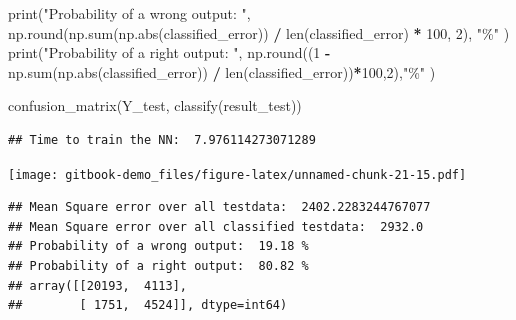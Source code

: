 \documentclass[
]{book}
\newenvironment{Shaded}{\begin{snugshade}}{\end{snugshade}}
\newcommand{\BuiltInTok}[1]{#1}
\newcommand{\DecValTok}[1]{\textcolor[rgb]{0.00,0.00,0.81}{#1}}
\newcommand{\NormalTok}[1]{#1}
\newcommand{\OperatorTok}[1]{\textcolor[rgb]{0.81,0.36,0.00}{\textbf{#1}}}
\newcommand{\StringTok}[1]{\textcolor[rgb]{0.31,0.60,0.02}{#1}}
\begin{document}
\begin{Shaded}
\begin{Highlighting}[]
\BuiltInTok{print}\NormalTok{(}\StringTok{"Probability of a wrong output: "}\NormalTok{, np.}\BuiltInTok{round}\NormalTok{(np.}\BuiltInTok{sum}\NormalTok{(np.}\BuiltInTok{abs}\NormalTok{(classified\_error)) }\OperatorTok{/} \BuiltInTok{len}\NormalTok{(classified\_error) }\OperatorTok{*} \DecValTok{100}\NormalTok{, }\DecValTok{2}\NormalTok{), }\StringTok{"\%"}\NormalTok{ )}
\BuiltInTok{print}\NormalTok{(}\StringTok{"Probability of a right output: "}\NormalTok{, np.}\BuiltInTok{round}\NormalTok{((}\DecValTok{1} \OperatorTok{{-}}\NormalTok{ np.}\BuiltInTok{sum}\NormalTok{(np.}\BuiltInTok{abs}\NormalTok{(classified\_error)) }\OperatorTok{/} \BuiltInTok{len}\NormalTok{(classified\_error))}\OperatorTok{*}\DecValTok{100}\NormalTok{,}\DecValTok{2}\NormalTok{),}\StringTok{"\%"}\NormalTok{ )}


\NormalTok{confusion\_matrix(Y\_test, classify(result\_test))}
\end{Highlighting}
\end{Shaded}

\begin{verbatim}
## Time to train the NN:  7.976114273071289
\end{verbatim}

\texttt{[image: gitbook-demo\_files/figure-latex/unnamed-chunk-21-15.pdf]}

\begin{verbatim}
## Mean Square error over all testdata:  2402.2283244767077
## Mean Square error over all classified testdata:  2932.0
## Probability of a wrong output:  19.18 %
## Probability of a right output:  80.82 %
## array([[20193,  4113],
##        [ 1751,  4524]], dtype=int64)
\end{verbatim}
\end{document}
